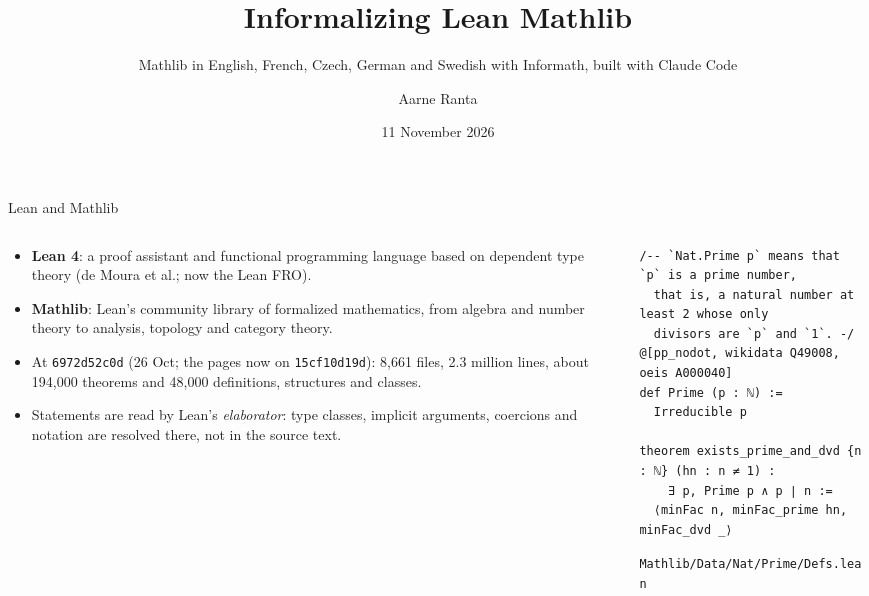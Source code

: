 \documentclass[10pt,aspectratio=169]{beamer}
\title{Informalizing Lean Mathlib}
\subtitle{Mathlib in English, French, Czech, German and Swedish with Informath, built with Claude Code}
\author{Aarne Ranta}
\date{11 November 2026}
\newcommand{\commit}[1]{\texttt{\footnotesize #1}}
\begin{document}
\maketitle


\begin{frame}[fragile]{Lean and Mathlib}
  \small
  \begin{columns}[T]
    \begin{column}{0.5\textwidth}
      \begin{itemize}
        \item \textbf{Lean 4}: a proof assistant and functional programming
              language based on dependent type theory (de Moura et al.;
              now the Lean FRO).
        \item \textbf{Mathlib}: Lean's community library of formalized
              mathematics, from algebra and number theory to analysis,
              topology and category theory.
        \item At \commit{6972d52c0d} (26 Oct; the pages now on \commit{15cf10d19d}):
              8,661 files, 2.3 million lines, about 194,000 theorems and
              48,000 definitions, structures and classes.
        \item Statements are read by Lean's \emph{elaborator}: type classes,
              implicit arguments, coercions and notation are resolved there,
              not in the source text.
      \end{itemize}
    \end{column}
    \begin{column}{0.48\textwidth}
\begin{lstlisting}
/-- `Nat.Prime p` means that `p` is a prime number,
  that is, a natural number at least 2 whose only
  divisors are `p` and `1`. -/
@[pp_nodot, wikidata Q49008, oeis A000040]
def Prime (p : ℕ) :=
  Irreducible p

theorem exists_prime_and_dvd {n : ℕ} (hn : n ≠ 1) :
    ∃ p, Prime p ∧ p ∣ n :=
  ⟨minFac n, minFac_prime hn, minFac_dvd _⟩
\end{lstlisting}
      \footnotesize\centering\texttt{Mathlib/Data/Nat/Prime/Defs.lean}
    \end{column}
  \end{columns}
\end{frame}
\end{document}
